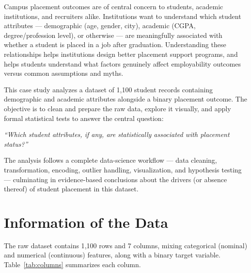\documentclass[11pt]{article}
\begin{document}
Campus placement outcomes are of central concern to students, academic institutions, and recruiters alike. Institutions want to understand which student attributes --- demographic (age, gender, city), academic (CGPA, degree/profession level), or otherwise --- are meaningfully associated with whether a student is placed in a job after graduation. Understanding these relationships helps institutions design better placement support programs, and helps students understand what factors genuinely affect employability outcomes versus common assumptions and myths.

This case study analyzes a dataset of 1{,}100 student records containing demographic and academic attributes alongside a binary placement outcome. The objective is to clean and prepare the raw data, explore it visually, and apply formal statistical tests to answer the central question:

\begin{center}
\itshape ``Which student attributes, if any, are statistically associated with placement status?''
\end{center}

The analysis follows a complete data-science workflow --- data cleaning, transformation, encoding, outlier handling, visualization, and hypothesis testing --- culminating in evidence-based conclusions about the drivers (or absence thereof) of student placement in this dataset.

\section{Information of the Data}

The raw dataset contains 1{,}100 rows and 7 columns, mixing categorical (nominal) and numerical (continuous) features, along with a binary target variable. Table~\ref{tab:columns} summarizes each column.
\end{document}
